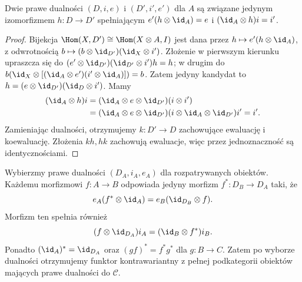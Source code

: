 \begin{stwierdzenie}\label{cat:prop:dual-unique}
Dwie prawe dualności $(D,i,e)$ i $(D',i',e')$ dla $A$ są związane jedynym izomorfizmem $h:D\to D'$ spełniającym
$e'(h\otimes\id_A)=e$ i $(\id_A\otimes h)i=i'$.
\end{stwierdzenie}
\begin{proof}
Bijekcja $\Hom(X,D')\cong\Hom(X\otimes A,I)$ jest dana przez $h\mapsto e'(h\otimes\id_A)$, z odwrotnością $b\mapsto(b\otimes\id_{D'})(\id_X\otimes i')$. Złożenie w pierwszym kierunku upraszcza się do $(e'\otimes\id_{D'})(\id_{D'}\otimes i')h=h$; w drugim do $b(\id_X\otimes[(\id_A\otimes e')(i'\otimes\id_A)])=b$. Zatem jedyny kandydat to $h=(e\otimes\id_{D'})(\id_D\otimes i')$. Mamy
\[
\begin{aligned}
(\id_A\otimes h)i
&=(\id_A\otimes e\otimes\id_{D'})(i\otimes i')\\
&=(\id_A\otimes e\otimes\id_{D'})(i\otimes\id_A\otimes\id_{D'})i'=i'.
\end{aligned}
\]
Zamieniając dualności, otrzymujemy $k:D'\to D$ zachowujące ewaluację i koewaluację. Złożenia $kh,hk$ zachowują ewaluacje, więc przez jednoznaczność są identycznościami.
\end{proof}
\begin{stwierdzenie}\label{cat:prop:dual-functoriality}
Wybierzmy prawe dualności $(D_A,i_A,e_A)$ dla rozpatrywanych obiektów. Każdemu morfizmowi $f:A\to B$ odpowiada jedyny morfizm $f^*:D_B\to D_A$ taki, że
\begin{equation}\label{cat:eq:dual-morphism-eval}
e_A(f^*\otimes\id_A)=e_B(\id_{D_B}\otimes f).
\end{equation}
Morfizm ten spełnia również
\begin{equation}\label{cat:eq:dual-morphism-coeval}
(f\otimes\id_{D_A})i_A=(\id_B\otimes f^*)i_B.
\end{equation}
Ponadto $(\id_A)^*=\id_{D_A}$ oraz $(gf)^*=f^*g^*$ dla $g:B\to C$. Zatem po wyborze dualności otrzymujemy funktor kontrawariantny z pełnej podkategorii obiektów mających prawe dualności do $\mathcal C$.
\end{stwierdzenie}
